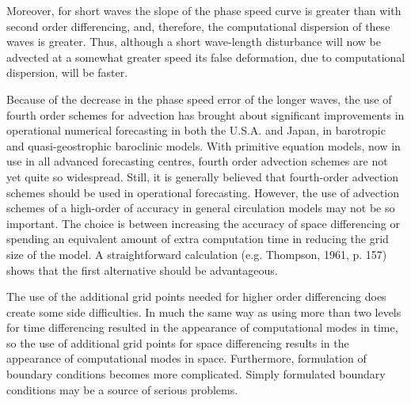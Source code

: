 Moreover, for short waves the slope of the phase speed curve is greater
than with second order differencing, and, therefore, the computational
dispersion of these waves is greater. Thus, although a short wave-length
disturbance will now be advected at a somewhat greater speed its false
deformation, due to computational dispersion, will be faster.

Because of the decrease in the phase speed error of the longer waves,
the use of fourth order schemes for advection has brought about
significant improvements in operational numerical forecasting in both
the U.S.A. and Japan, in barotropic and quasi-geostrophic baroclinic
models. With primitive equation models, now in use in all advanced
forecasting centres, fourth order advection schemes are not yet quite so
widespread. Still, it is generally believed that fourth-order advection
schemes should be used in operational forecasting. However, the use of
advection schemes of a high-order of accuracy in general circulation
models may not be so important. The choice is between increasing the
accuracy of space differencing or spending an equivalent amount of extra
computation time in reducing the grid size of the model. A
straightforward calculation (e.g. Thompson, 1961, p. 157) shows that
the first alternative should be advantageous.

The use of the additional grid points needed for higher order
differencing does create some side difficulties. In much the same way as
using more than two levels for time differencing resulted in the
appearance of computational modes in time, so the use of additional
grid points for space differencing results in the appearance of
computational modes in space. Furthermore, formulation of boundary
conditions becomes more complicated. Simply formulated boundary
conditions may be a source of serious problems.

